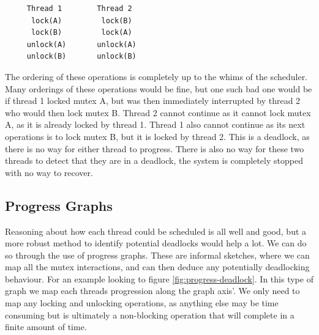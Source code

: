 \begin{minipage}{1.0\linewidth}
  \begin{verbatim}
     Thread 1        Thread 2 
      lock(A)         lock(B)
      lock(B)         lock(A)
     unlock(A)       unlock(A)
     unlock(B)       unlock(B)
  \end{verbatim}
\end{minipage}

The ordering of these operations is completely up to the whims of the scheduler. Many orderings of these operations would be fine, but one such bad one would be if thread 1 locked mutex A, but was then immediately interrupted by thread 2 who would then lock mutex B. Thread 2 cannot continue as it cannot lock mutex A, as it is already locked by thread 1. Thread 1 also cannot continue as its next operations is to lock mutex B, but it is locked by thread 2. This is a deadlock, as there is no way for either thread to progress. There is also no way for these two threads to detect that they are in a deadlock, the system is completely stopped with no way to recover.

\subsection{Progress Graphs}

Reasoning about how each thread could be scheduled is all well and good, but a more robust method to identify potential deadlocks would help a lot. We can do so through the use of progress graphs. These are informal sketches, where we can map all the mutex interactions, and can then deduce any potentially deadlocking behaviour. For an example looking to figure \ref{fig:progress-deadlock}. In this type of graph we map each threads progression along the graph axis'. We only need to map any locking and unlocking operations, as anything else may be time consuming but is ultimately a non-blocking operation that will complete in a finite amount of time.

